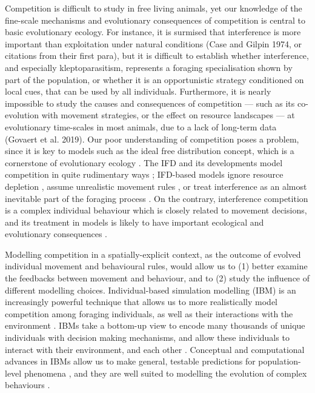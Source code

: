 \documentclass[11pt]{article}
\begin{document}
Competition is difficult to study in free living animals, yet our knowledge of the fine-scale mechanisms and evolutionary consequences of competition is central to basic evolutionary ecology.
For instance, it is surmised that interference is more important than exploitation under natural conditions (Case and Gilpin 1974, or citations from their first para), but it is difficult to establish whether interference, and especially kleptoparasitism, represents a foraging specialisation shown by part of the population, or whether it is an opportunistic strategy conditioned on local cues, that can be used by all individuals.
Furthermore, it is nearly impossible to study the causes and consequences of competition --- such as its co-evolution with movement strategies, or the effect on resource landscapes --- at evolutionary time-scales in most animals, due to a lack of long-term data (Govaert et al. 2019).
Our poor understanding of competition poses a problem, since it is key to models such as the ideal free distribution concept, which is a cornerstone of evolutionary ecology \citep{fretwell1970}.
The IFD and its developments model competition in quite rudimentary ways \citep{tregenza1995,cressman2006,fretwell1970,meer1997,matsumura2010,amano2006,garay2010,garay2015,garay2020,folmer2012}; IFD-based models ignore resource depletion \citep{fretwell1970,meer1997,cressman2006}, assume unrealistic movement rules \citep{cressman2006,cressman2014,garay2020}, or treat interference as an almost inevitable part of the foraging process \citep[reviewed in][; see also \citealt{cressman2006, garay2020}]{meer1997, tregenza1995}.
On the contrary, interference competition is a complex individual behaviour which is closely related to movement decisions, and its treatment in models is likely to have important ecological and evolutionary consequences \citep{meer1997}.

Modelling competition in a spatially-explicit context, as the outcome of evolved individual movement and behavioural rules, would allow us to (1) better examine the feedbacks between movement and behaviour, and to (2) study the influence of different modelling choices.
Individual-based simulation modelling (IBM) is an increasingly powerful technique that allows us to more realistically model competition among foraging individuals, as well as their interactions with the environment \citep{deangelis2005,deangelis2018,grimm2017,railsback2020,huston1988}.
IBMs take a bottom-up view to encode many thousands of unique individuals with decision making mechanisms, and allow these individuals to interact with their environment, and each other \citep{huston1988,deangelis2019}.
Conceptual and computational advances in IBMs \citep[][]{deangelis2018,deangelis2005} allow us to make general, testable predictions for population-level phenomena \citep[e.g. animal space use, or life-history strategies; see][]{spiegel2017,schaefer2018,folmer2012}, and they are well suited to modelling the evolution of complex behaviours \citep{netz2020,guttal2010,getz2016,getz2015}.
\end{document}
